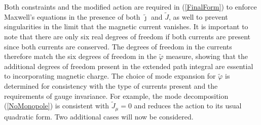 \documentclass[a4paper,a4paper]{article}
\begin{document}
Both constraints and the modified action are required in (\ref{FinalForm}) to enforce Maxwell's equations in the presence of both $\tilde{\jmath}$ and $\tilde{J}$, as well to prevent singularities in the limit that the magnetic current vanishes.  It is important to note that there are only six real degrees of freedom if both currents are present since both currents are conserved. The degrees of freedom in the currents therefore match the six degrees of freedom in the $\tilde{\varphi}$ measure, showing that the additional degrees of freedom present in the extended path integral are essential to incorporating magnetic charge.  The choice of mode expansion for $\tilde{\varphi}$ is determined for consistency with the type of currents present and the requirements of gauge invariance. For example, the mode decomposition (\ref{NoMonopole}) is consistent with $\tilde{J}_\mu = 0$ and reduces the action to its usual quadratic form.  Two additional cases will now be considered.
\end{document}
